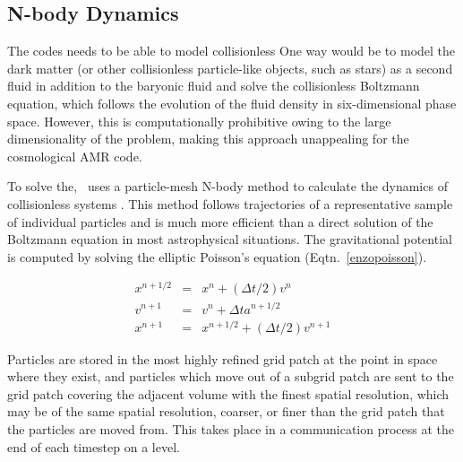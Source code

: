 \subsection{N-body Dynamics}
\label{sec.ov.nbody}

The codes needs to be able to model collisionless 
One way would be to model the dark matter (or other collisionless particle-like objects, such as stars) as a second fluid in addition to the baryonic fluid and solve the collisionless Boltzmann equation, which follows the evolution of the fluid density in six-dimensional phase space.  However, this is computationally prohibitive owing to the large dimensionality of the problem, making this approach  unappealing for the cosmological AMR code.

To solve the, \enzo\ uses a particle-mesh N-body method to calculate 
the dynamics of collisionless systems \citep{Hockney88}.  This method 
follows trajectories 
of a representative sample of individual particles and is much more 
efficient than a direct solution of the Boltzmann equation in most 
astrophysical situations. 
The gravitational potential is computed by solving the elliptic 
Poisson's equation (Eqtn.~\ref{enzopoisson}).

\begin{eqnarray}
\label{eqn.driftkick}
x^{n+1/2} & = & x^n + (\Delta t/2) v^{n} \nonumber \\
v^{n+1} & = & v^n + \Delta t a^{n+1/2} \\
x^{n+1} & = & x^{n+1/2} + (\Delta t/2) v^{n+1} \nonumber
\end{eqnarray}



Particles are stored in the most highly refined grid patch at the point in space where they exist, and particles which move out of a subgrid patch are sent to the grid patch covering the adjacent volume with the finest spatial resolution, which may be of the same spatial resolution, coarser, or finer than the grid patch that the particles are moved from.  This takes place in a communication process at the end of each timestep on a level.

